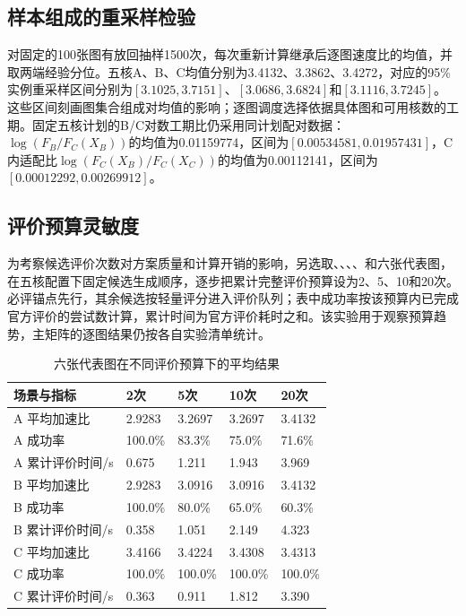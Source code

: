 \subsection{样本组成的重采样检验}
对固定的100张图有放回抽样1500次，每次重新计算继承后逐图速度比的均值，并取两端经验分位。五核A、B、C均值分别为3.4132、3.3862、3.4272，对应的95\%实例重采样区间分别为$[3.1025,3.7151]$、$[3.0686,3.6824]$和$[3.1116,3.7245]$。这些区间刻画图集合组成对均值的影响；逐图调度选择依据具体图和可用核数的工期。固定五核计划的B/C对数工期比仍采用同计划配对数据：$\log(F_B/F_C(X_B))$的均值为0.01159774，区间为$[0.00534581,0.01957431]$，C内适配比$\log(F_C(X_B)/F_C(X_C))$的均值为0.00112141，区间为$[0.00012292,0.00269912]$。

\subsection{评价预算灵敏度}
为考察候选评价次数对方案质量和计算开销的影响，另选取、、、、和六张代表图，在五核配置下固定候选生成顺序，逐步把累计完整评价预算设为2、5、10和20次。必评锚点先行，其余候选按轻量评分进入评价队列；表中成功率按该预算内已完成官方评价的尝试数计算，累计时间为官方评价耗时之和。该实验用于观察预算趋势，主矩阵的逐图结果仍按各自实验清单统计。
\begin{table}[H]\centering\scriptsize
\caption{六张代表图在不同评价预算下的平均结果}
\label{tab:budget-sensitivity}
\begin{tabularx}{\linewidth}{lYYYY}
\toprule
场景与指标 & 2次 & 5次 & 10次 & 20次\\\midrule
A 平均加速比 & 2.9283 & 3.2697 & 3.2697 & 3.4132\\
A 成功率 & 100.0\% & 83.3\% & 75.0\% & 71.6\%\\
A 累计评价时间/s & 0.675 & 1.211 & 1.943 & 3.969\\
B 平均加速比 & 2.9283 & 3.0916 & 3.0916 & 3.4132\\
B 成功率 & 100.0\% & 80.0\% & 65.0\% & 60.3\%\\
B 累计评价时间/s & 0.358 & 1.051 & 2.149 & 4.323\\
C 平均加速比 & 3.4166 & 3.4224 & 3.4308 & 3.4313\\
C 成功率 & 100.0\% & 100.0\% & 100.0\% & 100.0\%\\
C 累计评价时间/s & 0.363 & 0.911 & 1.812 & 3.390\\
\bottomrule
\end{tabularx}
\end{table}

